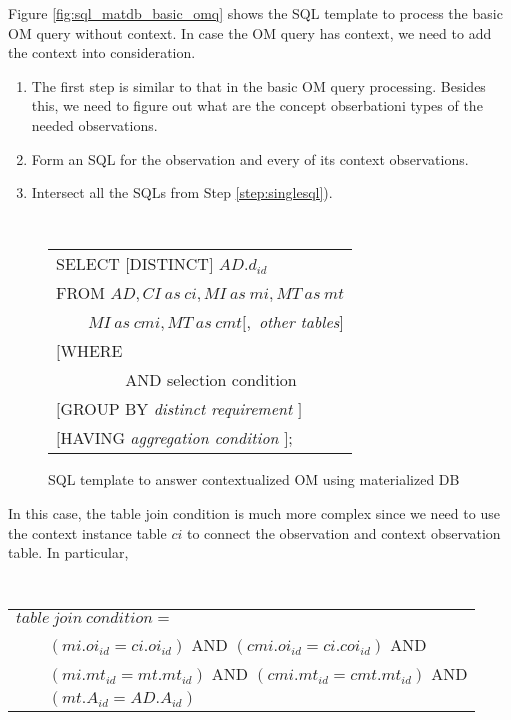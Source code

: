 \documentclass[conference]{IEEEtran}
\begin{document}
Figure \ref{fig:sql_matdb_basic_omq} shows the SQL template to process
the basic OM query without context. In case the OM query has context,
we need to add the context into consideration. 

\begin{enumerate}
\item The first step is similar to that in the basic OM query
  processing. Besides this, we need to figure out what are the concept
  obserbationi types of the needed observations.  
\item \label{step:singlesql} Form an SQL for the observation and every of its context
  observations. 
\item Intersect all the SQLs from Step \ref{step:singlesql}). 
\end{enumerate}


\begin{figure}[htb]
{\tt
\begin{tabular}{l}
SELECT $[$DISTINCT$]$ $AD.d_{id}$\\
FROM $AD, CI~as~ci,MI~as~mi, MT~as~mt$\\
$\qquad MI~as~cmi, MT~as~cmt[,$ {\em other tables}$]$\\
$[$WHERE    {\em table join condition, \\
$\qquad\qquad$ AND selection condition}$]$,\\
$[$GROUP BY {\em distinct requirement} $]$\\
$[$HAVING   {\em aggregation condition} $]$;
\end{tabular}
}
\caption{SQL template to answer contextualized OM using materialized DB}
\label{fig:sql_matdb_context_omq}
\end{figure}

In this case, the table join condition is much more complex since we
need to use the context instance table $ci$ to connect the
observation and context observation table. 
In particular,

\vspace{0.1in}
{\tt 
\begin{tabular}{l}
$table~join~condition=$\\
$\qquad (mi.oi_{id}=ci.oi_{id})$ AND $(cmi.oi_{id}=ci.coi_{id})$ AND\\
$\qquad (mi.mt_{id}=mt.mt_{id})$ AND $(cmi.mt_{id}=cmt.mt_{id})$ AND\\
$\qquad (mt.A_{id}=AD.A_{id})$
\end{tabular}
}
\vspace{0.1in}
\end{document}

